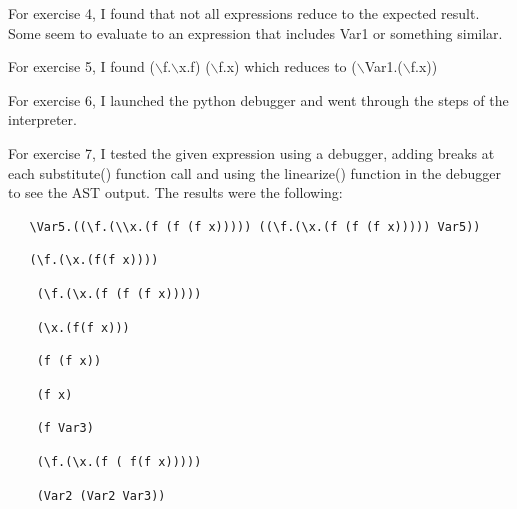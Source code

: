 \documentclass{article}
\theoremstyle{theorem}
\theoremstyle{definition}
\theoremstyle{remark}
\begin{document}
\hspace{0.65cm}For exercise 4, I found that not all expressions reduce to the expected result. Some seem to evaluate to an expression that includes Var1 or something similar.

\hspace{0.65cm}For exercise 5, I found ($\backslash$f.$\backslash$x.f) ($\backslash$f.x) which reduces to ($\backslash$Var1.($\backslash$f.x))

\hspace{0.65cm}For exercise 6, I launched the python debugger and went through the steps of the interpreter.

\hspace{0.65cm}For exercise 7, I tested the given expression using a debugger, adding breaks at each substitute() function call and using the linearize() function in the debugger to see the AST output. The results were the following:\\

\begin{verbatim}
   \Var5.((\f.(\\x.(f (f (f x))))) ((\f.(\x.(f (f (f x))))) Var5))
  \end{verbatim}

\begin{verbatim}
   (\f.(\x.(f(f x))))
  \end{verbatim}

  \begin{verbatim}
    (\f.(\x.(f (f (f x)))))
   \end{verbatim}

   \begin{verbatim}
    (\x.(f(f x)))
   \end{verbatim}

   \begin{verbatim}
    (f (f x))
   \end{verbatim}

   \begin{verbatim}
    (f x)
   \end{verbatim}

   \begin{verbatim}
    (f Var3)
   \end{verbatim}

   \begin{verbatim}
    (\f.(\x.(f ( f(f x)))))
   \end{verbatim}

   \begin{verbatim}
    (Var2 (Var2 Var3))
   \end{verbatim}
\end{document}

